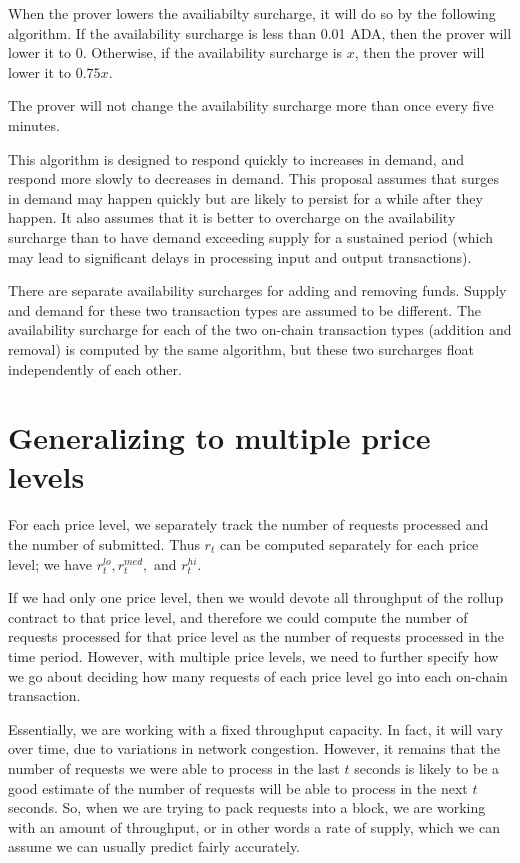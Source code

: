 \documentclass[12pt]{article}
\begin{document}
When the prover lowers the availiabilty surcharge, it will do so by the following algorithm. If the availability surcharge is less than 0.01 ADA, then the prover will lower it to 0. Otherwise, if the availability surcharge is $x$, then the prover will lower it to $0.75x$.

The prover will not change the availability surcharge more than once every five minutes.

This algorithm is designed to respond quickly to increases in demand, and respond more slowly to decreases in demand. This proposal assumes that surges in demand may happen quickly but are likely to persist for a while after they happen. It also assumes that it is better to overcharge on the availability surcharge than to have demand exceeding supply for a sustained period (which may lead to significant delays in processing input and output transactions).

There are separate availability surcharges for adding and removing funds. Supply and demand for these two transaction types are assumed to be different. The availability surcharge for each of the two on-chain transaction types (addition and removal) is computed by the same algorithm, but these two surcharges float independently of each other.

\section{Generalizing to multiple price levels}

For each price level, we separately track the number of requests processed and the number of submitted. Thus $r_t$ can be computed separately for each price level; we have $r_t^{lo}, r_t^{med},$ and $r_t^{hi}$.

If we had only one price level, then we would devote all throughput of the rollup contract to that price level, and therefore we could compute the number of requests processed for that price level as the number of requests processed in the time period. However, with multiple price levels, we need to further specify how we go about deciding how many requests of each price level go into each on-chain transaction.

Essentially, we are working with a fixed throughput capacity. In fact, it will vary over time, due to variations in network congestion. However, it remains that the number of requests we were able to process in the last $t$ seconds is likely to be a good estimate of the number of requests will be able to process in the next $t$ seconds. So, when we are trying to pack requests into a block, we are working with an amount of throughput, or in other words a rate of supply, which we can assume we can usually predict fairly accurately. 
\end{document}
